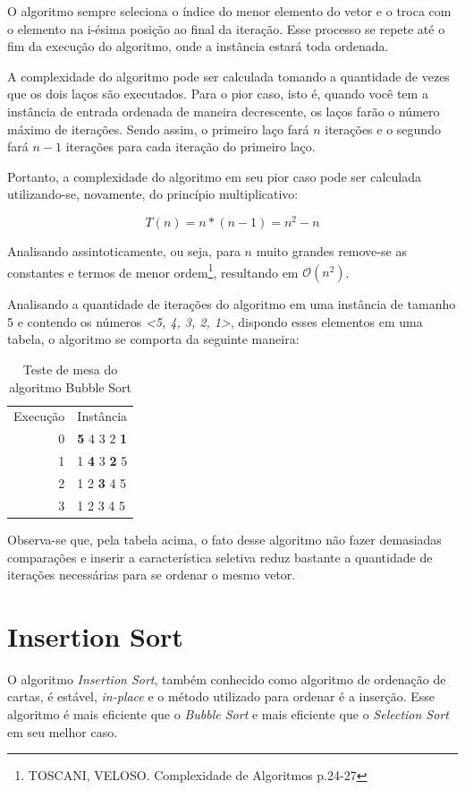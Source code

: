 \documentclass[a4paper, 12pt]{report}
\begin{document}
O algoritmo sempre seleciona o índice do menor elemento do vetor e o troca
com o elemento na i-ésima posição ao final da iteração. Esse processo se
repete até o fim da execução do algoritmo, onde a instância estará toda
ordenada.

A complexidade do algoritmo pode ser calculada tomando a quantidade de vezes
que os dois laços são executados. Para o pior caso, isto é, quando você tem a
instância de entrada ordenada de maneira decrescente, os laços farão o número
máximo de iterações. Sendo assim, o primeiro laço fará $n$ iterações e o
segundo fará $n-1$ iterações para cada iteração do primeiro laço.

Portanto, a complexidade do algoritmo em seu pior caso pode ser calculada
utilizando-se, novamente, do princípio multiplicativo:

\begin{displaymath}
T(n) = n * (n-1) = n^2-n
\end{displaymath}

Analisando assintoticamente, ou seja, para $n$ muito grandes remove-se as
constantes e termos de menor ordem\footnote{TOSCANI, VELOSO. Complexidade de Algoritmos p.24-27}, resultando em $\mathcal{O}(n^2)$.

Analisando a quantidade de iterações do algoritmo em uma instância de tamanho
5 e contendo os números \emph{<5, 4, 3, 2, 1>}, dispondo esses elementos em
uma tabela, o algoritmo se comporta da seguinte maneira:

\begin{table}[!ht]
\caption{Teste de mesa do algoritmo Bubble Sort}
\centering
\begin{tabular}{rl}
Execução & Instância\\
0 & \textbf{5} 4 3 2 \textbf{1}\\
1 & 1 \textbf{4} 3 \textbf{2} 5\\
2 & 1 2 \textbf{3} 4 5\\
3 & 1 2 3 4 5\\
\end{tabular}
\end{table}

Observa-se que, pela tabela acima, o fato desse algoritmo não fazer demasiadas
comparações e inserir a característica seletiva reduz bastante a quantidade de
iterações necessárias para se ordenar o mesmo vetor.

\section{Insertion Sort}
\label{sec-2-1-3}
O algoritmo \emph{Insertion Sort}, também conhecido como algoritmo de ordenação de
cartas, é estável, \emph{in-place} e o método utilizado para ordenar é a inserção.
Esse algoritmo é mais eficiente que o \emph{Bubble Sort} e mais eficiente que o
\emph{Selection Sort} em seu melhor caso.
\end{document}
